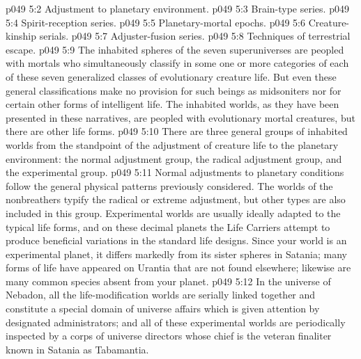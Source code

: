 \vs p049 5:2 \bibnobreakspace Adjustment to planetary environment.
\vs p049 5:3 \bibnobreakspace Brain\hyp{}type series.
\vs p049 5:4 \bibnobreakspace Spirit\hyp{}reception series.
\vs p049 5:5 \bibnobreakspace Planetary\hyp{}mortal epochs.
\vs p049 5:6 \bibnobreakspace Creature\hyp{}kinship serials.
\vs p049 5:7 \bibnobreakspace Adjuster\hyp{}fusion series.
\vs p049 5:8 \bibnobreakspace Techniques of terrestrial escape.
\vs p049 5:9 \pc The inhabited spheres of the seven superuniverses are peopled with mortals who simultaneously classify in some one or more categories of each of these seven generalized classes of evolutionary creature life. But even these general classifications make no provision for such beings as midsoniters nor for certain other forms of intelligent life. The inhabited worlds, as they have been presented in these narratives, are peopled with evolutionary mortal creatures, but there are other life forms.
\vs p049 5:10 \bibnobreakspace {} There are three general groups of inhabited worlds from the standpoint of the adjustment of creature life to the planetary environment: the normal adjustment group, the radical adjustment group, and the experimental group.
\vs p049 5:11 Normal adjustments to planetary conditions follow the general physical patterns previously considered. The worlds of the nonbreathers typify the radical or extreme adjustment, but other types are also included in this group. Experimental worlds are usually ideally adapted to the typical life forms, and on these decimal planets the Life Carriers attempt to produce beneficial variations in the standard life designs. Since your world is an experimental planet, it differs markedly from its sister spheres in Satania; many forms of life have appeared on Urantia that are not found elsewhere; likewise are many common species absent from your planet.
\vs p049 5:12 In the universe of Nebadon, all the life\hyp{}modification worlds are serially linked together and constitute a special domain of universe affairs which is given attention by designated administrators; and all of these experimental worlds are periodically inspected by a corps of universe directors whose chief is the veteran finaliter known in Satania as Tabamantia.
